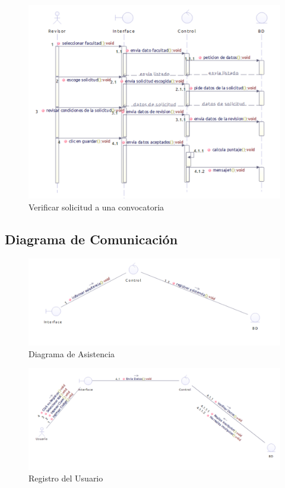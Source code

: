 	\begin{figure}[th!]
	\centering
	\includegraphics[width=1.4\linewidth]{uml/SecVerifSolConv}
	\caption{Verificar solicitud a una convocatoria}
	\label{fig:Verificar solicitud a una convocatoria}
	\end{figure}
\clearpage

\newpage




\subsection{Diagrama de Comunicación}


\begin{figure}[th!]
	\centering
	\includegraphics[width=0.9\linewidth]{uml/Comunicacion/ComAsist}
	\caption{Diagrama de Asistencia}
	\label{fig:Diagrama de Asistencia}
\end{figure}

\begin{figure}[th!]
	\centering
	\includegraphics[width=1.1\linewidth]{uml/Comunicacion/ComReguU}
	\caption{Registro del Usuario}
	\label{fig:Registro del Usuario}
\end{figure}

